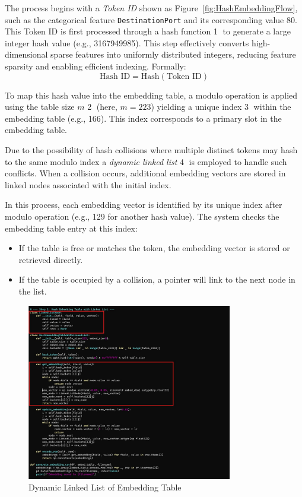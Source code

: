 \begin{ZhChapter}
    The process begins with a \textit{Token ID} shown as Figure~\ref{fig:HashEmbeddingFlow}, such as the categorical feature \texttt{DestinationPort} and its corresponding value 80. This Token ID is first processed through a hash function \textcircled{1} to generate a large integer hash value (e.g., 3167949985). This step effectively converts high-dimensional sparse features into uniformly distributed integers, reducing feature sparsity and enabling efficient indexing. Formally:
    \begin{equation}
        \text{Hash ID} = \text{Hash}(\text{Token ID})
    \end{equation}

    To map this hash value into the embedding table, a modulo operation is applied using the table size \( m \) \textcircled{2} (here, \( m = 223 \)) yielding a unique index \textcircled{3} within the embedding table (e.g., 166). This index corresponds to a primary slot in the embedding table.

    Due to the possibility of hash collisions where multiple distinct tokens may hash to the same modulo index a \textit{dynamic linked list} \textcircled{4} is employed to handle such conflicts. When a collision occurs, additional embedding vectors are stored in linked nodes associated with the initial index.

    In this process, each embedding vector is identified by its unique index after modulo operation (e.g., 129 for another hash value). The system checks the embedding table entry at this index:

    \begin{itemize}
        \item If the table is free or matches the token, the embedding vector is stored or retrieved directly.
        \item If the table is occupied by a collision, a pointer will link to the next node in the list.
    \end{itemize}


    \begin{figure}[htbp]
        \centering
        \includegraphics[width = 0.8\textwidth]{image/LinklistCode.jpg}
        \caption{Dynamic Linked List of Embedding Table}
        \label{fig:link}
    \end{figure}


\end{ZhChapter}
